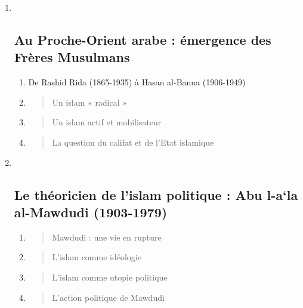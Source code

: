 \begin{enumerate}
\def\labelenumi{\Roman{enumi}.}
\item ~
  \hypertarget{au-proche-orient-arabe-uxe9mergence-des-fruxe8res-musulmans}{%
  \subsection{\texorpdfstring{{Au Proche-Orient arabe} :
  {émergence des Frères
  Musulmans}}{Au Proche-Orient arabe : émergence des Frères Musulmans}}\label{au-proche-orient-arabe-uxe9mergence-des-fruxe8res-musulmans}}

  \begin{enumerate}
  \def\labelenumii{\arabic{enumii}.}
  \item
    De Rashid Rida (1865-1935) à Hasan al-Banna (1906-1949)
  \item
    \begin{quote}
    Un islam « radical »
    \end{quote}
  \item
    \begin{quote}
    Un islam actif et mobilisateur
    \end{quote}
  \item
    \begin{quote}
    La question du califat et de l'Etat islamique
    \end{quote}
  \end{enumerate}
\item ~
  \hypertarget{le-thuxe9oricien-de-lislam-politique-abu-l-ala-al-mawdudi-1903-1979}{%
  \subsection{\texorpdfstring{{Le théoricien de l'islam
  politique} : {Abu l-a`la al-Mawdudi
  (1903-1979)}}{Le théoricien de l'islam politique : Abu l-a`la al-Mawdudi (1903-1979)}}\label{le-thuxe9oricien-de-lislam-politique-abu-l-ala-al-mawdudi-1903-1979}}

  \begin{enumerate}
  \def\labelenumii{\arabic{enumii}.}
  \item
    \begin{quote}
    Mawdudi : une vie en rupture
    \end{quote}
  \item
    \begin{quote}
    L'islam comme idéologie
    \end{quote}
  \item
    \begin{quote}
    L'islam comme utopie politique
    \end{quote}
  \item
    \begin{quote}
    L'action politique de Mawdudi
    \end{quote}
  \end{enumerate}
\end{enumerate}

